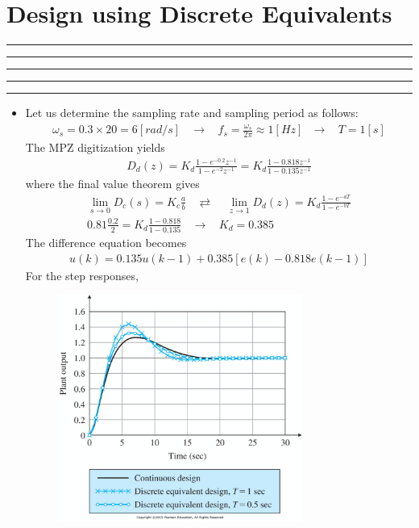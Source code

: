\setcounter{chapter}{7}
\setcounter{section}{2}
\section{Design using Discrete Equivalents}
\vspace{-8pt} \hrule \hrule \hrule \hrule \hrule  \vspace{12pt}
\begin{itemize}[]
	\item []
	     Let us determine the sampling rate and sampling period as follows:
		\begin{align*}
			\omega_s = 0.3 \times 20 = 6 [rad/s]~~~~\rightarrow~~~~
			f_s = \frac{\omega_s}{2\pi} \approx 1 [Hz]~~~\rightarrow~~~~ T = 1[s]
		\end{align*}
		The MPZ digitization yields 
		\begin{align*}
			D_d(z) = K_d \frac{1-e^{-0.2}z^{-1}}{1-e^{-2}z^{-1}} = K_d  \frac{1-0.818z^{-1}}{1-0.135z^{-1}} 
		\end{align*}
		where the final value theorem gives 
		\begin{align*}
					\lim_{s \rightarrow 0} D_c(s) = K_c \frac{a}{b} ~~~~\rightleftarrows~~~~~ 
			\lim_{z \rightarrow 1} D_d(z) = K_d \frac{1-e^{-aT}}{1-e^{-bT}} \\
						0.81 \frac{0.2}{2}  = K_d \frac{1-0.818}{1-0.135} ~~~~\rightarrow~~~~K_d = 0.385
		\end{align*}
		The difference equation becomes
		\begin{align*}
			u(k) = 0.135u(k-1) + 0.385 [e(k) - 0.818 e(k-1)] 
		\end{align*}
		For the step responses, 
		\begin{figure}[h]
			\centering
			\includegraphics[width=8cm]{./FIG_Franklin/fig8-14.png}
		\end{figure}

\end{itemize}